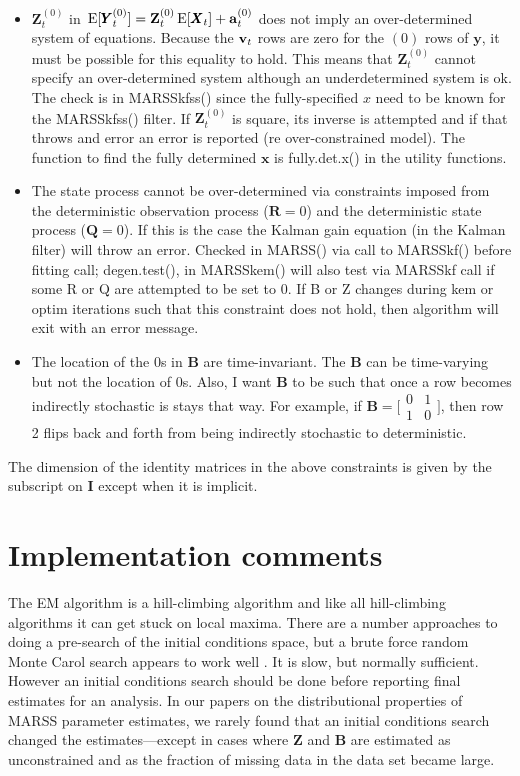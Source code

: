 \documentclass[]{article}
\def\UPS{\mbox{\boldmath $\Upsilon$}}
\def\XI{\mbox{\boldmath $\Xi$}}
\def\BB{\mbox{$\mathbf B$}}	\def\bb{\mbox{$\mathbf b$}} \def\Bb{\mbox{$\mathbf J$}} \def\Ba{\mbox{$\mathbf L$}} \def\Bm{\UPS}
\def\E{\,\textup{\textrm{E}}}
\def\II{\mbox{$\mathbf I$}} \def\ii{\mbox{$\mathbf i$}}
\def\QQ{\mbox{$\mathbf Q$}}	 \def\qq{\mbox{$\mathbf q$}} \def\Qb{\mbox{$\mathbf G$}}  \def\Qm{\mathbb{Q}}
\def\RR{\mbox{$\mathbf R$}}	 \def\rr{\mbox{$\mathbf r$}} \def\Rb{\mbox{$\mathbf H$}}	\def\Rm{\mathbb{R}}
\def\XX{\mbox{$\pmb{X}$}}	\def\xx{\mbox{$\pmb{x}$}}
\def\YY{\mbox{$\pmb{Y}$}}	\def\yy{\mbox{$\pmb{y}$}}
\def\ZZ{\mbox{$\mathbf Z$}}	\def\zz{\mbox{$\mathbf z$}}	\def\Zb{\mbox{$\mathbf M$}} \def\Za{\mbox{$\mathbf N$}} \def\Zm{\XI}
\begin{document}
\begin{itemize}
\item $\ZZ_t^{(0)}$ in $\E[\YY_t^{(0)}]=\ZZ_t^{(0)}\E[\XX_t]+\aa_t^{(0)}$ does not imply an over-determined system of equations.  Because the $\mbox{$\mathbf v$}_t$ rows are zero for the ${(0)}$ rows of $\yy$, it must be possible for this equality to hold.  This means that $\ZZ_t^{(0)}$ cannot specify an over-determined system although an underdetermined system is ok.  The check is in MARSSkfss() since the fully-specified $x$ need to be known for the MARSSkfss() filter. If $\ZZ_t^{(0)}$ is square, its inverse is attempted and if that throws and error an error is reported (re over-constrained model). The function to find the fully determined $\xx$ is fully.det.x() in the utility functions.
\item The state process cannot be over-determined via constraints imposed from the deterministic observation process ($\RR=0$) and the deterministic state process ($\QQ=0$).  If this is the case the Kalman gain equation (in the Kalman filter) will throw an error.  Checked in MARSS() via call to MARSSkf() before fitting call; degen.test(), in MARSSkem() will also test via MARSSkf call if some R or Q are attempted to be set to 0.  If B or Z changes during kem or optim iterations such that this constraint does not hold, then algorithm will exit with an error message.
\item The location of the 0s in $\BB$ are time-invariant.  The $\BB$ can be time-varying but not the location of 0s.  Also, I want $\BB$ to be such that once a row becomes indirectly stochastic is stays that way.  For example, if $\BB=\bigl[ \begin{smallmatrix}
0&1\\ 1&0 \end{smallmatrix} \bigr]$, then row 2 flips back and forth from being indirectly stochastic to deterministic.
\end{itemize}
The dimension of the identity matrices in the above constraints is given by the subscript on $\II$ except when it is implicit.

\section{Implementation comments}\label{sec:implementation}
The EM algorithm is a hill-climbing algorithm and like all hill-climbing algorithms it can get stuck on local maxima.  There are a number approaches to doing a pre-search of the initial conditions space, but a brute force  random Monte Carol search appears to work well \citep{Biernackietal2003}.  It is slow, but normally sufficient.  However an initial conditions search should be done before reporting final estimates for an analysis.  In our papers on the distributional properties of  MARSS parameter estimates, we rarely found that an initial conditions search changed the estimates---except in cases where $\ZZ$ and $\BB$ are estimated as unconstrained and as the fraction of missing data in the data set became large.
\end{document}

